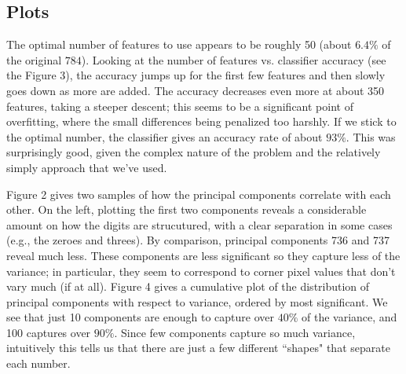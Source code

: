 \documentclass[twocolumn]{article}
\begin{document}
\subsection{Plots}
\label{subsec:plots}

The optimal number of features to use appears to be roughly 50 (about $6.4\%$ of the original $784$). Looking at the number of features vs. classifier accuracy (see the Figure 3), the accuracy jumps up for the first few features and then slowly goes down as more are added. The accuracy decreases even more at about 350 features, taking a steeper descent; this seems to be a significant point of overfitting, where the small differences being penalized too harshly. If we stick to the optimal number, the classifier gives an accuracy rate of about $93\%$. This was surprisingly good, given the complex nature of the problem and the relatively simply approach that we've used. 

Figure 2 gives two samples of how the principal components correlate with each other. On the left, plotting the first two components reveals a considerable amount on how the digits are strucutured, with a clear separation in some cases (e.g., the zeroes and threes). By comparison, principal components 736 and 737 reveal much less. These components are less significant so they capture less of the variance; in particular, they seem to correspond to corner pixel values that don't vary much (if at all). Figure 4 gives a cumulative plot of the distribution of principal components with respect to variance, ordered by most significant. We see that just 10 components are enough to capture over $40\%$ of the variance, and 100 captures over $90\%$. Since few components capture so much variance, intuitively this tells us that there are just a few different ``shapes" that separate each number. 
\end{document}
